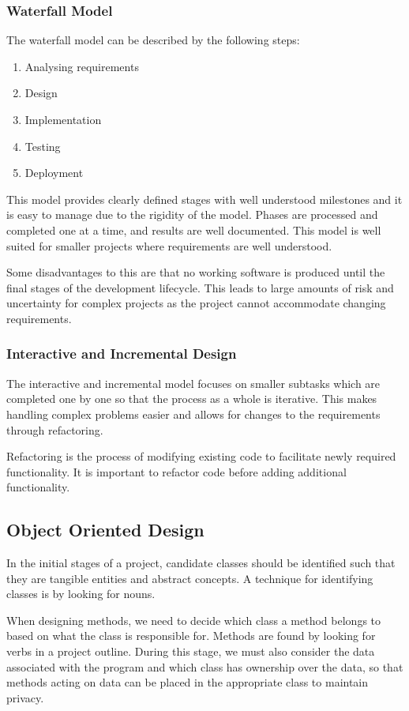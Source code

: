 \documentclass{article}
\begin{document}
\subsubsection{Waterfall Model}
The waterfall model can be described by the following steps:
\begin{enumerate}
    \item Analysing requirements
    \item Design
    \item Implementation
    \item Testing
    \item Deployment
\end{enumerate}
This model provides clearly defined stages with well understood milestones and
it is easy to manage due to the rigidity of the model.
Phases are processed and completed one at a time, and results are well documented.
This model is well suited for smaller projects where requirements are well understood.

Some disadvantages to this are that no working software is produced until the final stages of the
development lifecycle. This leads to large amounts of risk and uncertainty for complex projects
as the project cannot accommodate changing requirements.
\subsubsection{Interactive and Incremental Design}
The interactive and incremental model focuses on smaller subtasks which are completed
one by one so that the process as a whole is iterative. This makes handling complex problems
easier and allows for changes to the requirements through refactoring.

Refactoring is the process of modifying existing code to facilitate newly required functionality.
It is important to refactor code before adding additional functionality.
\subsection{Object Oriented Design}
In the initial stages of a project, candidate classes should be identified such that they are tangible entities
and abstract concepts. A technique for identifying classes is by looking for nouns.

When designing methods, we need to decide which class a method belongs to based on what the class is
responsible for. Methods are found by looking for verbs in a project outline.
During this stage, we must also consider the data associated with the program and which class
has ownership over the data, so that methods acting on data can be placed in the appropriate class
to maintain privacy.
\end{document}
